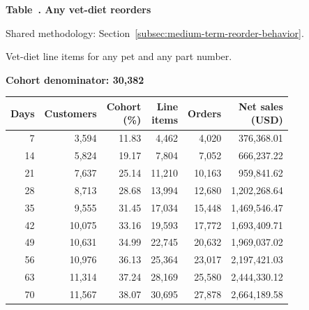\label{tab:financial-opportunity-reorder-any-vet-diet}
\par\smallskip\noindent\parbox[t][2\baselineskip][t]{\linewidth}{\raggedright\textbf{Table~\thetable. Any vet-diet reorders}}
\par\raggedright\footnotesize Shared methodology: Section~\ref{subsec:medium-term-reorder-behavior}.
\par\noindent\parbox[t][2\baselineskip][t]{\linewidth}{\raggedright Vet-diet line items for any pet and any part number.}
\par\noindent\textbf{Cohort denominator: 30,382}
\par\centering\footnotesize
\setlength{\tabcolsep}{2pt}
\begin{tabular}{rrrrrr}\toprule
Days & Customers & \shortstack{Cohort\\(\%)} & \shortstack{Line\\items} & Orders & \shortstack{Net sales\\(USD)} \\ \midrule

7 & 3,594 & 11.83 & 4,462 & 4,020 & 376,368.01 \\

14 & 5,824 & 19.17 & 7,804 & 7,052 & 666,237.22 \\

21 & 7,637 & 25.14 & 11,210 & 10,163 & 959,841.62 \\

28 & 8,713 & 28.68 & 13,994 & 12,680 & 1,202,268.64 \\

35 & 9,555 & 31.45 & 17,034 & 15,448 & 1,469,546.47 \\

42 & 10,075 & 33.16 & 19,593 & 17,772 & 1,693,409.71 \\

49 & 10,631 & 34.99 & 22,745 & 20,632 & 1,969,037.02 \\

56 & 10,976 & 36.13 & 25,364 & 23,017 & 2,197,421.03 \\

63 & 11,314 & 37.24 & 28,169 & 25,580 & 2,444,330.12 \\

70 & 11,567 & 38.07 & 30,695 & 27,878 & 2,664,189.58 \\
\bottomrule\end{tabular}\par
